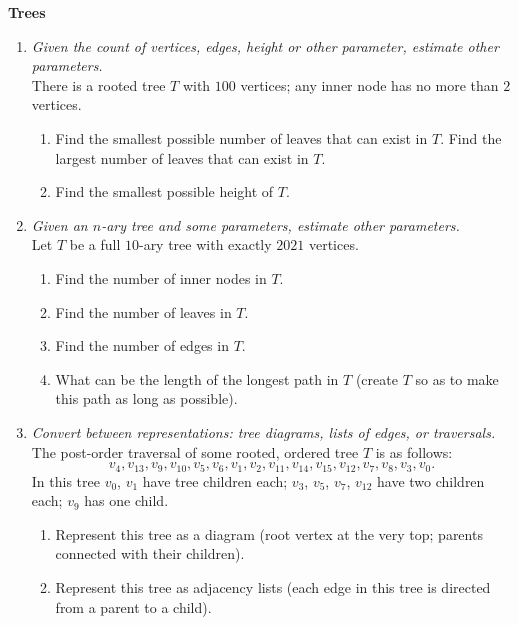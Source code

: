 \documentclass[a4paper,12pt]{article}
\begin{document}
\vspace{10pt}
{\bf Trees}


\begin{enumerate}
\item {\small \em  Given the count of vertices, edges, height or other parameter, estimate other parameters.}\\
There is a rooted tree $T$ with $100$ vertices; any inner node has no more than $2$ vertices. 
\begin{enumerate}
\item Find the smallest possible number of leaves that can exist in $T$.
Find the largest number of leaves that can exist in $T$. 
\item Find the smallest possible height of $T$. 
\end{enumerate}

\item {\small \em  Given an $n$-ary tree and some parameters, estimate other parameters.}\\
Let $T$ be a full $10$-ary tree with exactly $2021$ vertices. 
\begin{enumerate}
\item Find the number of inner nodes in $T$.
\item Find the number of leaves in $T$. 
\item Find the number of edges in $T$. 
\item What can be the length of the longest path in $T$ (create $T$ so as
to make this path as long as possible). 
\end{enumerate}



\item {\small \em  Convert between representations: tree diagrams, lists of edges, or traversals.}\\
The post-order traversal of some rooted, ordered tree $T$ is as follows:
\[ v_{4}, v_{13}, v_{9}, v_{10}, v_{5}, v_{6}, v_{1}, v_{2}, v_{11}, v_{14}, 
v_{15}, v_{12}, v_{7}, v_{8}, v_{3}, v_{0}. \]
In this tree $v_0$, $v_1$ have tree children each; $v_3$, $v_5$, $v_7$, $v_{12}$ have
two children each; $v_{9}$ has one child.
\begin{enumerate}
\item Represent this tree as a diagram (root vertex at the very top; parents connected with 
their children). 
\item Represent this tree as adjacency lists (each edge in this tree is directed
from a parent to a child). 
\end{enumerate}



\end{enumerate}
\end{document}
